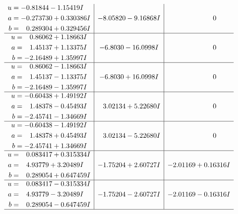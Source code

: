 \documentclass[1p]{elsarticle_modified}
\theoremstyle{definition}
\begin{document}
$$\begin{array}{c|c|c}
\begin{aligned}
u &= -0.81844 - 1.15419 I \\
a &= -0.273730 + 0.330386 I \\
b &= \phantom{-}0.289304 + 0.329456 I\end{aligned}
 & -8.05820 - 9.16868 I & \phantom{-0.000000 } 0 \\ \hline\begin{aligned}
u &= \phantom{-}0.86062 + 1.18663 I \\
a &= \phantom{-}1.45137 + 1.13375 I \\
b &= -2.16489 + 1.35997 I\end{aligned}
 & -6.8030 - 16.0998 I & \phantom{-0.000000 } 0 \\ \hline\begin{aligned}
u &= \phantom{-}0.86062 - 1.18663 I \\
a &= \phantom{-}1.45137 - 1.13375 I \\
b &= -2.16489 - 1.35997 I\end{aligned}
 & -6.8030 + 16.0998 I & \phantom{-0.000000 } 0 \\ \hline\begin{aligned}
u &= -0.60438 + 1.49192 I \\
a &= \phantom{-}1.48378 - 0.45493 I \\
b &= -2.45741 - 1.34669 I\end{aligned}
 & \phantom{-}3.02134 + 5.22680 I & \phantom{-0.000000 } 0 \\ \hline\begin{aligned}
u &= -0.60438 - 1.49192 I \\
a &= \phantom{-}1.48378 + 0.45493 I \\
b &= -2.45741 + 1.34669 I\end{aligned}
 & \phantom{-}3.02134 - 5.22680 I & \phantom{-0.000000 } 0 \\ \hline\begin{aligned}
u &= \phantom{-}0.083417 + 0.315334 I \\
a &= \phantom{-}4.93779 + 3.20489 I \\
b &= \phantom{-}0.289054 + 0.647459 I\end{aligned}
 & -1.75204 + 2.60727 I & -2.01169 + 0.16316 I \\ \hline\begin{aligned}
u &= \phantom{-}0.083417 - 0.315334 I \\
a &= \phantom{-}4.93779 - 3.20489 I \\
b &= \phantom{-}0.289054 - 0.647459 I\end{aligned}
 & -1.75204 - 2.60727 I & -2.01169 - 0.16316 I\\
 \hline 
 \end{array}$$\newpage\newpage\renewcommand{\arraystretch}{1}
\end{document}
